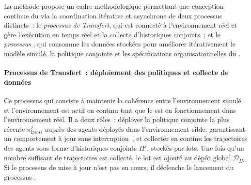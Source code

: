 La méthode  propose un cadre méthodologique permettant une conception continue du  via la coordination itérative et asynchrone de deux processus distincts~: le \textit{processus de Transfert}, qui est connecté à l'environnement réel et gère l'exécution en temps réel et la collecte d'historiques conjoints~; et le \textit{processus }, qui consomme les données stockées pour améliorer itérativement le modèle simulé, la politique conjointe et les spécifications organisationnelles du .

\paragraph{Processus de Transfert~: déploiement des politiques et collecte de données}

Ce processus qui consiste à maintenir la cohérence entre l'environnement simulé et l'environnement est actif en continu tant que le  est en fonctionnement dans l'environnement réel. Il a deux rôles~: déployer la politique conjointe la plus récente $\pi^j_{\text{latest}}$ auprès des agents déployés dans l'environnement cible, garantissant un comportement à jour sans interruption~; et collecter en continu les trajectoires des agents sous forme d'historiques conjoints $H^j$, stockés par lots. Une fois qu'un nombre suffisant de trajectoires est collecté, le lot est ajouté au dépôt global $\mathcal{D}_{H^j}$. Si le processus de mise à jour n'est pas en cours, il déclenche le lancement du processus \textit{}.


